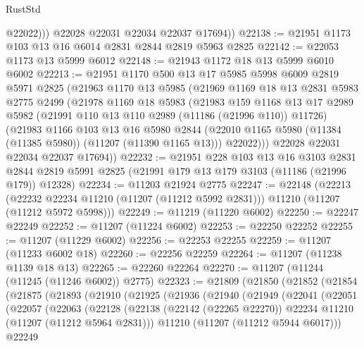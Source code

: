 \begin{lexlean}{RustStd}
\begin{coremodule}
              @22022)))
        @22028
        @22031
        @22034
        @22037
        @17694))
@22138 := @21951 @1173 @103 @13 @16 @6014 @2831 @2844 @2819 @5963 @2825
@22142 := @22053 @1173 @13 @5999 @6012
@22148 := @21943 @1172 @18 @13 @5999 @6010 @6002
@22213 := @21951
    @1170
    @500
    @13
    @17
    @5985
    @5998
    @6009
    @2819
    @5971
    @2825
    (@21963
      @1170
      @13
      @5985
      (@21969
        @1169
        @18
        @13
        @2831
        @5983
        @2775
        @2499
        (@21978
          @1169
          @18
          @5983
          (@21983
            @159
            @1168
            @13
            @17
            @2989
            @5982
            (@21991 @110 @13 @110 @2989 (@11186 (@21996 @110)) @11726)
            (@21983
              @1166
              @103
              @13
              @16
              @5980
              @2844
              (@22010 @1165 @5980 (@11384 (@11385 @5980)) (@11207 (@11390 @1165 @13)))
              @22022)))
        @22028
        @22031
        @22034
        @22037
        @17694))
@22232 := @21951
    @228
    @103
    @13
    @16
    @3103
    @2831
    @2844
    @2819
    @5991
    @2825
    (@21991 @179 @13 @179 @3103 (@11186 (@21996 @179)) @12328)
@22234 := @11203 @21924 @2775
@22247 := @22148
    (@22213
      (@22232 @22234 @11210 (@11207 (@11212 @5992 @2831)))
      @11210
      (@11207 (@11212 @5972 @5998)))
@22249 := @11219 (@11220 @6002)
@22250 := @22247 @22249
@22252 := @11207 (@11224 @6002)
@22253 := @22250 @22252
@22255 := @11207 (@11229 @6002)
@22256 := @22253 @22255
@22259 := @11207 (@11233 @6002 @18)
@22260 := @22256 @22259
@22264 := @11207 (@11238 @1139 @18 @13)
@22265 := @22260 @22264
@22270 := @11207 (@11244 (@11245 (@11246 @6002)) @2775)
@22323 := @21809
    (@21850
      (@21852
        (@21854
          (@21875
            (@21893
              (@21910
                (@21925
                  (@21936
                    (@21940
                      (@21949
                        (@22041
                          (@22051
                            (@22057
                              (@22063
                                (@22128
                                  (@22138
                                    (@22142 (@22265 @22270))
                                    @22234
                                    @11210
                                    (@11207 (@11212 @5964 @2831)))
                                  @11210
                                  (@11207 (@11212 @5944 @6017)))
                                @22249

\end{coremodule}
\end{lexlean}
